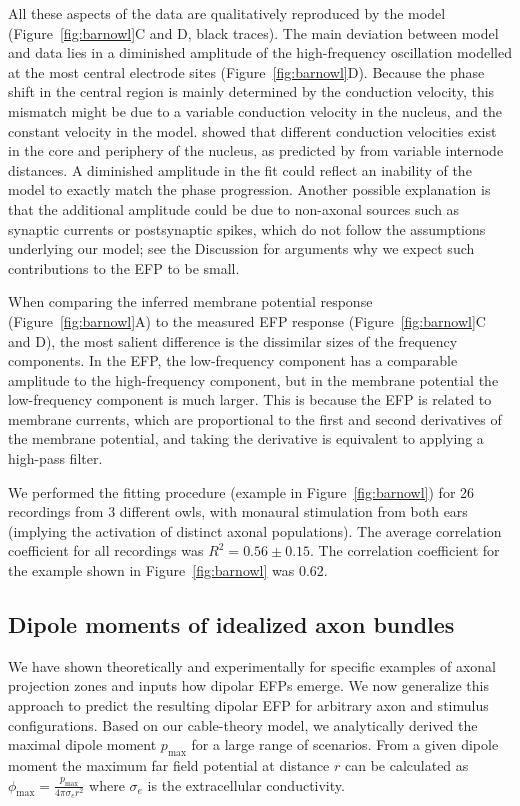 \documentclass[]{elife}
\begin{document}
All these aspects of the data are qualitatively reproduced by the model
(Figure~\ref{fig:barnowl}C and D, black traces). The main deviation
between model and data lies in a diminished amplitude of the
high-frequency oscillation modelled at the most central electrode sites
(Figure~\ref{fig:barnowl}D). Because the phase shift in the central
region is mainly determined by the conduction velocity, this mismatch
might be due to a variable conduction velocity in the nucleus, and the
constant velocity in the model. \citet{McColgan2014Functional} showed
that different conduction velocities exist in the core and periphery of
the nucleus, as predicted by \citet{carr90} from variable internode
distances. A diminished amplitude in the fit could reflect an inability
of the model to exactly match the phase progression. Another possible
explanation is that the additional amplitude could be due to non-axonal
sources such as synaptic currents or postsynaptic spikes, which do not
follow the assumptions underlying our model; see the Discussion for
arguments why we expect such contributions to the EFP to be small.

When comparing the inferred membrane potential response
(Figure~\ref{fig:barnowl}A) to the measured EFP response
(Figure~\ref{fig:barnowl}C and D), the most salient difference is the
dissimilar sizes of the frequency components. In the EFP, the
low-frequency component has a comparable amplitude to the high-frequency
component, but in the membrane potential the low-frequency component is
much larger. This is because the EFP is related to membrane currents,
which are proportional to the first and second derivatives of the
membrane potential, and taking the derivative is equivalent to applying
a high-pass filter.

We performed the fitting procedure (example in Figure~\ref{fig:barnowl})
for 26 recordings from 3 different owls, with monaural stimulation from
both ears (implying the activation of distinct axonal populations). The
average correlation coefficient for all recordings was
\(R^2=0.56\pm 0.15\). The correlation coefficient for the example shown
in Figure~\ref{fig:barnowl} was 0.62.

\subsection{Dipole moments of idealized axon
bundles}\label{dipole-moments-of-idealized-axon-bundles}

We have shown theoretically and experimentally for specific examples of
axonal projection zones and inputs how dipolar EFPs emerge. We now
generalize this approach to predict the resulting dipolar EFP for
arbitrary axon and stimulus configurations. Based on our cable-theory
model, we analytically derived the maximal dipole moment
\(p_\text{max}\) for a large range of scenarios. From a given dipole
moment the maximum far field potential at distance \(r\) can be
calculated as \(\phi_\text{max}=\frac{p_\text{max}}{4\pi \sigma_e r^2}\)
where \(\sigma_e\) is the extracellular conductivity.
\end{document}

